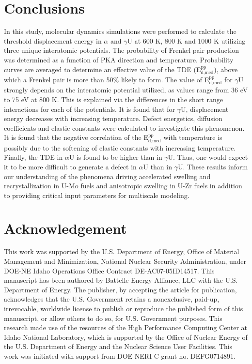 \documentclass[review]{elsarticle}
\providecommand{\DIFaddtex}[1]{{\protect\color{blue} \sf #1}} %
\providecommand{\DIFaddbegin}{} %
\providecommand{\DIFaddend}{} %
\providecommand{\DIFadd}[1]{\texorpdfstring{\DIFaddtex{#1}}{#1}} %
\newcommand{\DIFaddincludegraphics}[2][]{{\color{blue}\fbox{\DIFOincludegraphics[#1]{#2}}}} %
\DeclareRobustCommand{\DIFaddbegin}{\DIFOaddbegin \let\includegraphics\DIFaddincludegraphics} %
\DeclareRobustCommand{\DIFaddend}{\DIFOaddend \let\includegraphics\DIFOincludegraphics} %
\begin{document}
\FloatBarrier

\section{Conclusions}

In this study, molecular dynamics simulations were performed to calculate the \DIFaddbegin \DIFadd{threshold }\DIFaddend displacement energy in $\alpha$ and $\gamma$U at 600 K, 800 K and 1000 K utilizing three unique interatomic potentials. The probability of Frenkel pair production was determined as a function of PKA direction and temperature. Probability curves are averaged to determine an effective value of the TDE (E$^{\textrm{pp}}_{\textrm{d,med}}$), above which a Frenkel pair is more than 50$\%$ likely to form. The value of E$^{\textrm{pp}}_{\textrm{d,med}}$ for $\gamma$U strongly depends on the interatomic potential utilized, as values range from 36 eV to 75 eV at 800 K. This is explained via the differences in the short range interactions for each of the potentials. It is found that for $\gamma$U, displacement energy decreases with increasing temperature. Defect energetics, diffusion coefficients and elastic constants were calculated to investigate this phenomenon. It is found that the negative correlation of the E$^{\textrm{pp}}_{\textrm{d,med}}$ with temperature is possibly due to the softening of elastic constants with increasing temperature. Finally, the TDE in $\alpha$U is found to be higher than in $\gamma$U. Thus, one would expect it to be more difficult to generate a defect in $\alpha$U than in $\gamma$U. These results inform our understanding of the phenomena driving accelerated swelling and recrystallization in U-Mo fuels and anisotropic swelling in U-Zr fuels in addition to providing critical input parameters for multiscale modeling.

\section{Acknowledgement}
This work was supported by the U.S. Department of Energy, Office of Material Management and Minimization, National Nuclear Security Administration, under DOE-NE Idaho Operations Office Contract DE-AC07-05ID14517. This manuscript has been authored by Battelle Energy Alliance, LLC with the U.S. Department of Energy. The publisher, by accepting the article for publication, acknowledges that the U.S. Government retains a nonexclusive, paid-up, irrevocable, worldwide license to publish or reproduce the published form of this manuscript, or allow others to do so, for U.S. Government purposes. This research made use of the resources of the High Performance Computing Center at Idaho National Laboratory, which is supported by the Office of Nuclear Energy of the U.S. Department of Energy and the Nuclear Science User Facilities. This work was initiated with support from DOE NERI-C grant no. DEFG0714891.
\DIFaddbegin 
\end{document}
